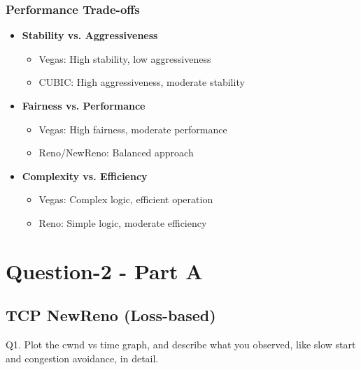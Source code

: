 \documentclass[11pt,a4paper]{article}
\begin{document}
\subsubsection{Performance Trade-offs}
\begin{itemize}
    \item \textbf{Stability vs. Aggressiveness}
    \begin{itemize}
        \item Vegas: High stability, low aggressiveness
        \item CUBIC: High aggressiveness, moderate stability
    \end{itemize}

    \item \textbf{Fairness vs. Performance}
    \begin{itemize}
        \item Vegas: High fairness, moderate performance
        \item Reno/NewReno: Balanced approach
    \end{itemize}

    \item \textbf{Complexity vs. Efficiency}
    \begin{itemize}
        \item Vegas: Complex logic, efficient operation
        \item Reno: Simple logic, moderate efficiency
    \end{itemize}
\end{itemize}


\section{\textcolor{sectioncolor}{Question-2 - Part A}}


\subsection{{TCP NewReno (Loss-based)}}
\begin{tcolorbox}[colback=boxbg, colframe=boxborder, title=Question-1]
    Q1. Plot the cwnd vs time graph, and describe what you observed, like slow start and
    congestion avoidance, in detail.
\end{tcolorbox}
\end{document}
